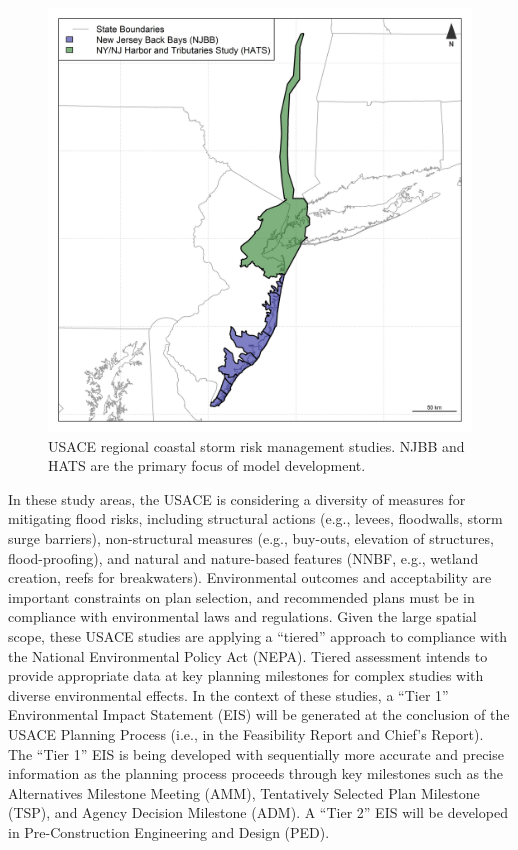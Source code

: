 \documentclass[
]{book}
\begin{document}
\begin{figure}
\includegraphics[width=44.44in]{ZZ_Fig01.01_USACE.Studies} \caption{USACE regional coastal storm risk management studies. NJBB and HATS are the primary focus of model development.}\label{fig:unnamed-chunk-2}
\end{figure}

In these study areas, the USACE is considering a diversity of measures for mitigating flood risks, including structural actions (e.g., levees, floodwalls, storm surge barriers), non-structural measures (e.g., buy-outs, elevation of structures, flood-proofing), and natural and nature-based features (NNBF, e.g., wetland creation, reefs for breakwaters). Environmental outcomes and acceptability are important constraints on plan selection, and recommended plans must be in compliance with environmental laws and regulations. Given the large spatial scope, these USACE studies are applying a ``tiered'' approach to compliance with the National Environmental Policy Act (NEPA). Tiered assessment intends to provide appropriate data at key planning milestones for complex studies with diverse environmental effects. In the context of these studies, a ``Tier 1'' Environmental Impact Statement (EIS) will be generated at the conclusion of the USACE Planning Process (i.e., in the Feasibility Report and Chief's Report). The ``Tier 1'' EIS is being developed with sequentially more accurate and precise information as the planning process proceeds through key milestones such as the Alternatives Milestone Meeting (AMM), Tentatively Selected Plan Milestone (TSP), and Agency Decision Milestone (ADM). A ``Tier 2'' EIS will be developed in Pre-Construction Engineering and Design (PED).
\end{document}
